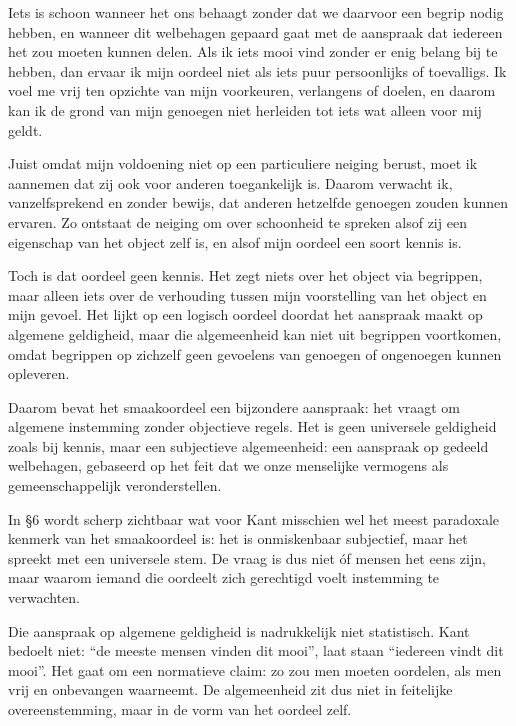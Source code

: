 \begin{mdframed}[leftmargin=0pt,rightmargin=0pt,backgroundcolor=blue!6,linecolor=white,innertopmargin=6pt,innerbottommargin=6pt]
Iets is schoon wanneer het ons behaagt zonder dat we daarvoor een begrip nodig hebben, en wanneer dit welbehagen gepaard gaat met de aanspraak dat iedereen het zou moeten kunnen delen. Als ik iets mooi vind zonder er enig belang bij te hebben, dan ervaar ik mijn oordeel niet als iets puur persoonlijks of toevalligs. Ik voel me vrij ten opzichte van mijn voorkeuren, verlangens of doelen, en daarom kan ik de grond van mijn genoegen niet herleiden tot iets wat alleen voor mij geldt.

Juist omdat mijn voldoening niet op een particuliere neiging berust, moet ik aannemen dat zij ook voor anderen toegankelijk is. Daarom verwacht ik, vanzelfsprekend en zonder bewijs, dat anderen hetzelfde genoegen zouden kunnen ervaren. Zo ontstaat de neiging om over schoonheid te spreken alsof zij een eigenschap van het object zelf is, en alsof mijn oordeel een soort kennis is.

Toch is dat oordeel geen kennis. Het zegt niets over het object via begrippen, maar alleen iets over de verhouding tussen mijn voorstelling van het object en mijn gevoel. Het lijkt op een logisch oordeel doordat het aanspraak maakt op algemene geldigheid, maar die algemeenheid kan niet uit begrippen voortkomen, omdat begrippen op zichzelf geen gevoelens van genoegen of ongenoegen kunnen opleveren.

Daarom bevat het smaakoordeel een bijzondere aanspraak: het vraagt om algemene instemming zonder objectieve regels. Het is geen universele geldigheid zoals bij kennis, maar een subjectieve algemeenheid: een aanspraak op gedeeld welbehagen, gebaseerd op het feit dat we onze menselijke vermogens als gemeenschappelijk veronderstellen.

\bigskip
In §6 wordt scherp zichtbaar wat voor Kant misschien wel het meest paradoxale kenmerk van het smaakoordeel is: het is onmiskenbaar subjectief, maar het spreekt met een universele stem. De vraag is dus niet óf mensen het eens zijn, maar waarom iemand die oordeelt zich gerechtigd voelt instemming te verwachten.

Die aanspraak op algemene geldigheid is nadrukkelijk niet statistisch. Kant bedoelt niet: “de meeste mensen vinden dit mooi”, laat staan “iedereen vindt dit mooi”. Het gaat om een normatieve claim: zo zou men moeten oordelen, als men vrij en onbevangen waarneemt. De algemeenheid zit dus niet in feitelijke overeenstemming, maar in de vorm van het oordeel zelf.


\end{mdframed}

